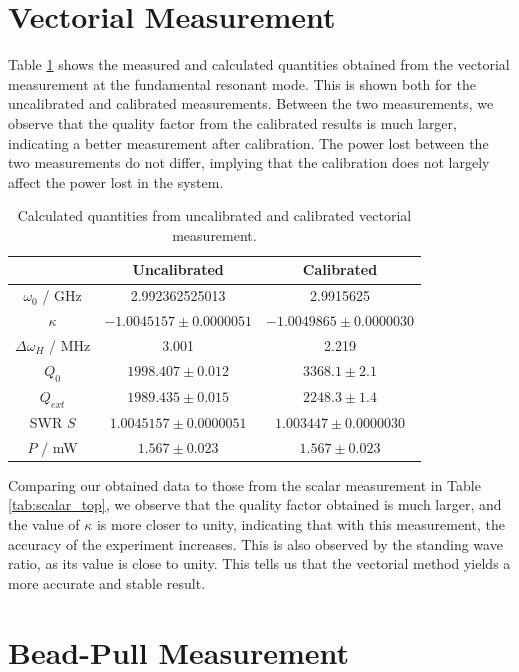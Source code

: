 \documentclass[a4paper]{report}
\numberwithin{equation}{section}
\begin{document}
\section{Vectorial Measurement}

Table \ref{tab:vectorial} shows the measured and calculated quantities obtained from the vectorial measurement at the fundamental resonant mode. This is 
shown both for the uncalibrated and calibrated measurements. Between the two measurements, we observe that the quality factor from the calibrated results
is much larger, indicating a better measurement after calibration. The power lost between the two measurements do not differ, implying that the calibration
does not largely affect the power lost in the system. \par 

\begin{table}[h!]
	\centering
	\begin{tabular}{|c|c|c|}
		\hline  & Uncalibrated & Calibrated \\ 
		\hline $\omega_0$ / GHz & 2.992362525013 & 2.9915625 \\
		\hline $\kappa$ & $-1.0045157 \pm 0.0000051$ & $-1.0049865\pm 0.0000030$ \\
		\hline $\Delta\omega_H$ / MHz & 3.001 & 2.219 \\
		\hline $Q_0$  & $1998.407 \pm 0.012$  & $3368.1 \pm 2.1$  \\
		\hline $Q_{ext}$ & $1989.435 \pm 0.015$ & $2248.3 \pm 1.4$ \\
		\hline SWR $S$ & $1.0045157 \pm 0.0000051$ & $1.003447 \pm 0.0000030$ \\
		\hline $P$ / mW & $1.567 \pm 0.023$ & $1.567 \pm 0.023$\\ 
		\hline   
	\end{tabular}
	\caption{Calculated quantities from uncalibrated and calibrated vectorial measurement. }
	\label{tab:vectorial}
\end{table}

Comparing our obtained data to those from the scalar measurement in Table \ref{tab:scalar_top}, we observe that the quality factor obtained is much larger, and the value of $\kappa$ is more
closer to unity, indicating that with this measurement, the accuracy of the experiment increases. This is also observed by the standing wave ratio, as its value is close to unity. This tells
us that the vectorial method yields a more accurate and stable result. \par

\section{Bead-Pull Measurement}
\end{document}
